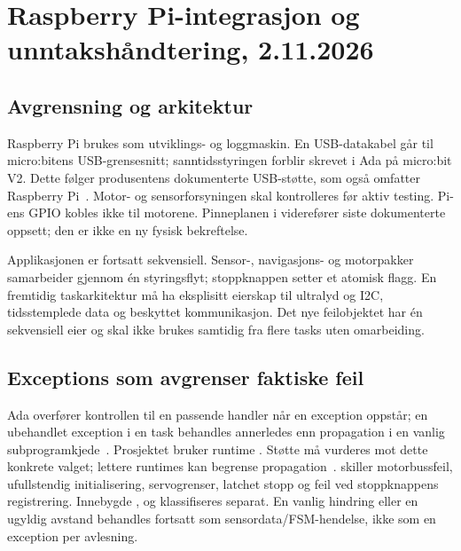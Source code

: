 \section{Raspberry Pi-integrasjon og unntakshåndtering, 2.11.2026}
\label{sec:piunntak}

\subsection{Avgrensning og arkitektur}
Raspberry Pi brukes som utviklings- og loggmaskin. En USB-datakabel går til
micro:bitens USB-grensesnitt; sanntidsstyringen forblir skrevet i Ada på
micro:bit V2. Dette følger produsentens dokumenterte USB-støtte, som også
omfatter Raspberry Pi~\cite{microbitusb2026}. Motor- og sensorforsyningen
skal kontrolleres før aktiv testing. Pi-ens GPIO kobles ikke til motorene.
Pinneplanen i  viderefører siste dokumenterte oppsett;
den er ikke en ny fysisk bekreftelse.

Applikasjonen er fortsatt sekvensiell. Sensor-, navigasjons- og motorpakker
samarbeider gjennom én styringsflyt; stoppknappen setter et atomisk flagg.
En fremtidig taskarkitektur må ha eksplisitt eierskap til ultralyd og I2C,
tidsstemplede data og beskyttet kommunikasjon. Det nye feilobjektet har én
sekvensiell eier og skal ikke brukes samtidig fra flere tasks uten omarbeiding.

\subsection{Exceptions som avgrenser faktiske feil}
Ada overfører kontrollen til en passende handler når en exception oppstår;
en ubehandlet exception i en task behandles annerledes enn propagation i en
vanlig subprogramkjede~\cite{adaexceptions2026}. Prosjektet bruker runtime
. Støtte må vurderes mot dette konkrete valget;
lettere runtimes kan begrense propagation~\cite{adart2026}.
 skiller motorbussfeil, ufullstendig initialisering,
servogrenser, latchet stopp og feil ved stoppknappens registrering. Innebygde
,  og 
klassifiseres separat. En vanlig hindring eller en ugyldig avstand behandles
fortsatt som sensordata/FSM-hendelse, ikke som en exception per avlesning.

